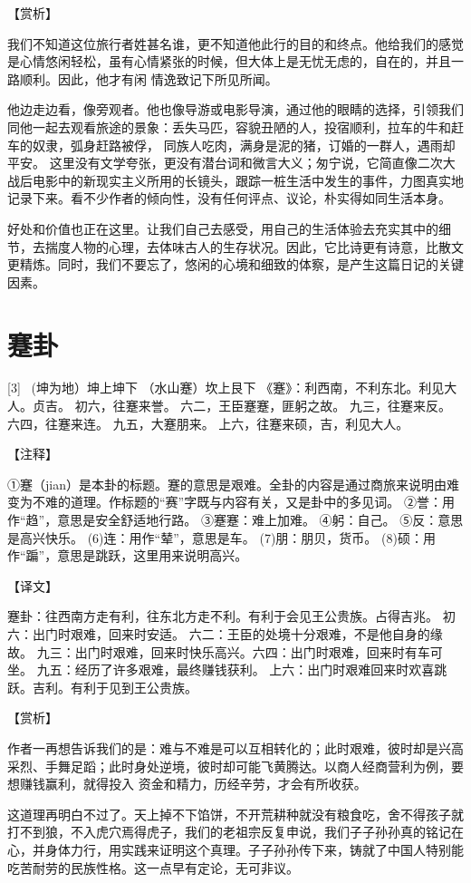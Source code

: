 \documentclass[12pt,UTF8]{ctexbook}
\begin{document}
【赏析】

我们不知道这位旅行者姓甚名谁，更不知道他此行的目的和终点。他给我们的感觉是心情悠闲轻松，虽有心情紧张的时候，但大体上是无忧无虑的，自在的，并且一路顺利。因此，他才有闲 情逸致记下所见所闻。

他边走边看，像旁观者。他也像导游或电影导演，通过他的眼睛的选择，引领我们同他一起去观看旅途的景象：丢失马匹，容貌丑陋的人，投宿顺利，拉车的牛和赶车的奴隶，弧身赶路被俘， 同族人吃肉，满身是泥的猪，订婚的一群人，遇雨却平安。 这里没有文学夸张，更没有潜台词和微言大义；匆宁说，它简直像二次大战后电影中的新现实主义所用的长镜头，跟踪一桩生活中发生的事件，力图真实地记录下来。看不少作者的倾向性，没有任何评点、议论，朴实得如同生活本身。

好处和价值也正在这里。让我们自己去感受，用自己的生活体验去充实其中的细节，去揣度人物的心理，去体味古人的生存状况。因此，它比诗更有诗意，比散文更精炼。同时，我们不要忘了，悠闲的心境和细致的体察，是产生这篇日记的关键因素。

\chapter{蹇卦}
[3] \ (坤为地）坤上坤下
（水山蹇）坎上艮下
《蹇》：利西南，不利东北。利见大人。贞吉。
初六，往蹇来誉。
六二，王臣蹇蹇，匪躬之故。
九三，往蹇来反。
六四，往蹇来连。
九五，大蹇朋来。
上六，往蹇来硕，吉，利见大人。

【注释】

①蹇（jian）是本卦的标题。蹇的意思是艰难。全卦的内容是通过商旅来说明由难变为不难的道理。作标题的“赛”字既与内容有关，又是卦中的多见词。
②誉：用作“趋”，意思是安全舒适地行路。
③蹇蹇：难上加难。
④躬：自己。
⑤反：意思是高兴快乐。
(6)连：用作“辇”，意思是车。
(7)朋：朋贝，货币。
(8)硕：用作“蹁”，意思是跳跃，这里用来说明高兴。

【译文】

蹇卦：往西南方走有利，往东北方走不利。有利于会见王公贵族。占得吉兆。
初六：出门时艰难，回来时安适。
六二：王臣的处境十分艰难，不是他自身的缘故。
九三：出门时艰难，回来时快乐高兴。六四：出门时艰难，回来时有车可坐。
九五：经历了许多艰难，最终赚钱获利。
上六：出门时艰难回来时欢喜跳跃。吉利。有利于见到王公贵族。

【赏析】

作者一再想告诉我们的是：难与不难是可以互相转化的；此时艰难，彼时却是兴高采烈、手舞足蹈；此时身处逆境，彼时却可能飞黄腾达。以商人经商营利为例，要想赚钱赢利，就得投入 资金和精力，历经辛劳，才会有所收获。

这道理再明白不过了。天上掉不下馅饼，不开荒耕种就没有粮食吃，舍不得孩子就打不到狼，不入虎穴焉得虎子，我们的老祖宗反复申说，我们子子孙孙真的铭记在心，并身体力行，用实践来证明这个真理。子子孙孙传下来，铸就了中国人特别能吃苦耐劳的民族性格。这一点早有定论，无可非议。
\end{document}
